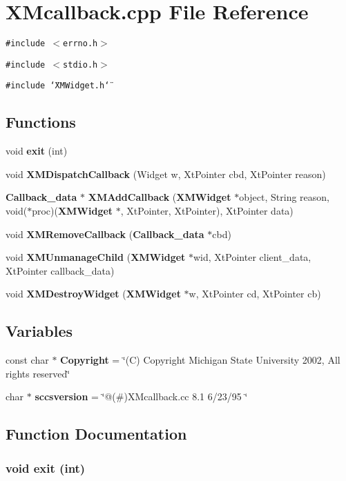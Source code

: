 \section{XMcallback.cpp File Reference}
\label{XMcallback_8cpp}
{\tt \#include $<$errno.h$>$}\par
{\tt \#include $<$stdio.h$>$}\par
{\tt \#include \char`\"{}XMWidget.h\char`\"{}}\par
\subsection*{Functions}
\begin{CompactItemize}
\item 
void {\bf exit} (int)
\item 
void {\bf XMDispatch\-Callback} (Widget w, Xt\-Pointer cbd, Xt\-Pointer reason)
\item 
{\bf Callback\_\-data} $\ast$ {\bf XMAdd\-Callback} ({\bf XMWidget} $\ast$object, String reason, void($\ast$proc)({\bf XMWidget} $\ast$, Xt\-Pointer, Xt\-Pointer), Xt\-Pointer data)
\item 
void {\bf XMRemove\-Callback} ({\bf Callback\_\-data} $\ast$cbd)
\item 
void {\bf XMUnmanage\-Child} ({\bf XMWidget} $\ast$wid, Xt\-Pointer client\_\-data, Xt\-Pointer callback\_\-data)
\item 
void {\bf XMDestroy\-Widget} ({\bf XMWidget} $\ast$w, Xt\-Pointer cd, Xt\-Pointer cb)
\end{CompactItemize}
\subsection*{Variables}
\begin{CompactItemize}
\item 
const char $\ast$ {\bf Copyright} = \char`\"{}(C) Copyright Michigan State University 2002, All rights reserved\char`\"{}
\item 
char $\ast$ {\bf sccsversion} = \char`\"{}@(\#)XMcallback.cc 8.1 6/23/95 \char`\"{}
\end{CompactItemize}


\subsection{Function Documentation}
\subsubsection{\setlength{\rightskip}{0pt plus 5cm}void exit (int)}\label{XMcallback_8cpp_a2}


